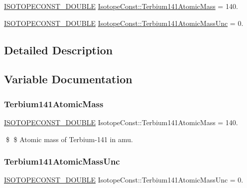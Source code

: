 \begin{DoxyCompactItemize}
\item 
\mbox{\hyperlink{group___isotope_const-_macros_ga8f45a7272ce02c0b4c65c44636ed719a}{I\+S\+O\+T\+O\+P\+E\+C\+O\+N\+S\+T\+\_\+\+D\+O\+U\+B\+LE}} \mbox{\hyperlink{group___isotope_const-_terbium-_tb141_ga86fe2ea41ca129017c020015d7ddb2cc}{Isotope\+Const\+::\+Terbium141\+Atomic\+Mass}} = 140.
\item 
\mbox{\hyperlink{group___isotope_const-_macros_ga8f45a7272ce02c0b4c65c44636ed719a}{I\+S\+O\+T\+O\+P\+E\+C\+O\+N\+S\+T\+\_\+\+D\+O\+U\+B\+LE}} \mbox{\hyperlink{group___isotope_const-_terbium-_tb141_ga443ce64d0a8b234fe25aa786956395ac}{Isotope\+Const\+::\+Terbium141\+Atomic\+Mass\+Unc}} = 0.
\end{DoxyCompactItemize}


\subsection{Detailed Description}


\subsection{Variable Documentation}
\mbox{\label{group___isotope_const-_terbium-_tb141_ga86fe2ea41ca129017c020015d7ddb2cc}} 
\subsubsection{\texorpdfstring{Terbium141\+Atomic\+Mass}{Terbium141AtomicMass}}
{\footnotesize\ttfamily \mbox{\hyperlink{group___isotope_const-_macros_ga8f45a7272ce02c0b4c65c44636ed719a}{I\+S\+O\+T\+O\+P\+E\+C\+O\+N\+S\+T\+\_\+\+D\+O\+U\+B\+LE}} Isotope\+Const\+::\+Terbium141\+Atomic\+Mass = 140.}

\$ \$ Atomic mass of Terbium-\/141 in amu. \mbox{\label{group___isotope_const-_terbium-_tb141_ga443ce64d0a8b234fe25aa786956395ac}} 
\subsubsection{\texorpdfstring{Terbium141\+Atomic\+Mass\+Unc}{Terbium141AtomicMassUnc}}
{\footnotesize\ttfamily \mbox{\hyperlink{group___isotope_const-_macros_ga8f45a7272ce02c0b4c65c44636ed719a}{I\+S\+O\+T\+O\+P\+E\+C\+O\+N\+S\+T\+\_\+\+D\+O\+U\+B\+LE}} Isotope\+Const\+::\+Terbium141\+Atomic\+Mass\+Unc = 0.}

